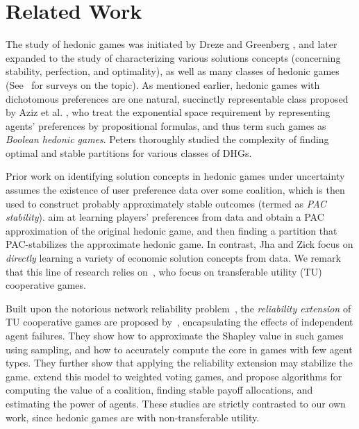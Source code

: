 \documentclass[letterpaper]{article} %
\begin{document}
\section{Related Work}
\label{sec:Related Work}
The study of hedonic games was initiated by Dreze and Greenberg , and later expanded to the study of characterizing various solutions concepts (concerning stability, perfection, and optimality), as well as many classes of hedonic games (See~\cite{aziz_savani_moulin_2016,woeginger2013core} for surveys on the topic). As mentioned earlier, hedonic games with dichotomous preferences are one natural, succinctly representable class proposed by Aziz et al. , %
who treat the exponential space requirement by representing agents’ preferences by propositional formulas, and thus term such games as \textit{Boolean hedonic games}. %
Peters  thoroughly studied the complexity of finding optimal and stable partitions for various classes of DHGs.
%

Prior work on identifying solution concepts in hedonic games under uncertainty assumes the existence of user preference data over some coalition, which is then used to construct probably approximately stable outcomes (termed as \textit{PAC stability}). \cite{sliwinski2017learning,igarashi2019forming} aim at learning players' preferences from data and obtain a PAC approximation of the original hedonic game, and then finding a partition that PAC-stabilizes the approximate hedonic game. In contrast, Jha and Zick  focus on \textit{directly} learning a variety of economic solution concepts from data. We remark that this line of research relies on~\cite{balcan2015learning}, who focus on transferable utility (TU) cooperative games.
%

Built upon the notorious network reliability problem~\cite{provan1983complexity}, the \textit{reliability extension} of TU cooperative games are proposed by~\cite{bachrach2011solving,bachrach2012agent}, encapsulating the effects of independent agent failures. They show how to approximate the Shapley value in such games using sampling, and how to accurately compute the core in games with few agent types. They further show that applying the reliability extension may stabilize the game. \cite{bachrach2013reliability} extend this model to weighted voting games, and propose algorithms for computing the value of a coalition, finding stable payoff allocations, and estimating the power of agents. These studies are strictly contrasted to our own work, since hedonic games are with non-transferable utility.
%
\end{document}
